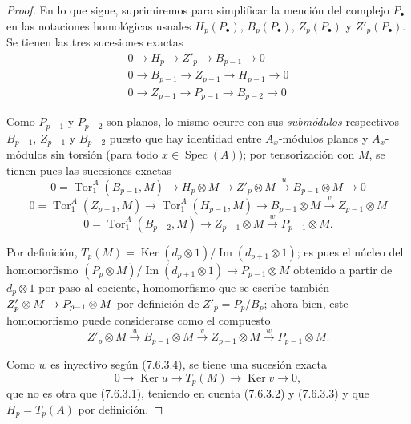\documentclass[10pt,oneside,openany]{book}
\theoremstyle{egaenv}\newtheorem*{env}{---}
\theoremstyle{egastatement}
\theoremstyle{egadescription}
\renewcommand{\to}{\mathchoice{\longrightarrow}{\rightarrow}{\rightarrow}{\rightarrow}}
\begin{document}
\begin{proof}
En lo que sigue, suprimiremos para simplificar la mención del complejo
$P_\bullet$ en las notaciones homológicas usuales $H_p(P_\bullet)$,
$B_p(P_\bullet)$, $Z_p(P_\bullet)$ y $Z'_p(P_\bullet)$. Se tienen las tres sucesiones
exactas
\begin{gather*}
  0\longrightarrow H_p\longrightarrow Z'_p\longrightarrow B_{p-1}
  \longrightarrow0\\
  0\longrightarrow B_{p-1}\longrightarrow Z_{p-1}\longrightarrow H_{p-1}
  \longrightarrow0\\
  0\longrightarrow Z_{p-1}\longrightarrow P_{p-1}\longrightarrow B_{p-2}
  \longrightarrow0
\end{gather*}

Como $P_{p-1}$ y $P_{p-2}$ son planos, lo mismo ocurre con sus
\emph{submódulos} respectivos $B_{p-1}$, $Z_{p-1}$ y $B_{p-2}$ puesto que hay
identidad entre $A_x$-módulos planos y $A_x$-módulos sin torsión (para todo
$x\in\operatorname{Spec}(A)$); por tensorización con $M$, se tienen pues las sucesiones
exactas
\[
  0=\operatorname{Tor}_1^A(B_{p-1},M)
  \longrightarrow H_p\otimes M
  \longrightarrow Z'_p\otimes M
  \xrightarrow{u}B_{p-1}\otimes M
  \longrightarrow0
  \tag{7.6.3.2}\label{III.7.6.3.2.fr}
\]
\[
  0=\operatorname{Tor}_1^A(Z_{p-1},M)
  \longrightarrow\operatorname{Tor}_1^A(H_{p-1},M)
  \longrightarrow B_{p-1}\otimes M
  \xrightarrow{v}Z_{p-1}\otimes M
  \tag{7.6.3.3}\label{III.7.6.3.3.fr}
\]
\[
  0=\operatorname{Tor}_1^A(B_{p-2},M)
  \longrightarrow Z_{p-1}\otimes M
  \xrightarrow{w}P_{p-1}\otimes M.
  \tag{7.6.3.4}\label{III.7.6.3.4.fr}
\]

Por definición,
$T_p(M)=\operatorname{Ker}(d_p\otimes1)/\operatorname{Im}(d_{p+1}\otimes1)$;
es pues el núcleo del homomorfismo
$(P_p\otimes M)/\operatorname{Im}(d_{p+1}\otimes1)\longrightarrow P_{p-1}\otimes M$
obtenido a partir de $d_p\otimes1$ por paso al cociente, homomorfismo que
se escribe también $Z'_p\otimes M\to P_{p-1}\otimes M$ por definición de
$Z'_p=P_p/B_p$; ahora bien, este homomorfismo puede considerarse como el compuesto
\[
  Z'_p\otimes M
  \xrightarrow{u}B_{p-1}\otimes M
  \xrightarrow{v}Z_{p-1}\otimes M
  \xrightarrow{w}P_{p-1}\otimes M.
\]

Como $w$ es inyectivo según (7.6.3.4), se tiene una sucesión exacta
\[
  0\longrightarrow\operatorname{Ker}u
  \longrightarrow T_p(M)
  \longrightarrow\operatorname{Ker}v
  \longrightarrow0,
\]
que no es otra que (7.6.3.1), teniendo en cuenta (7.6.3.2) y (7.6.3.3) y
que $H_p=T_p(A)$ por definición.
\end{proof}
\end{document}
